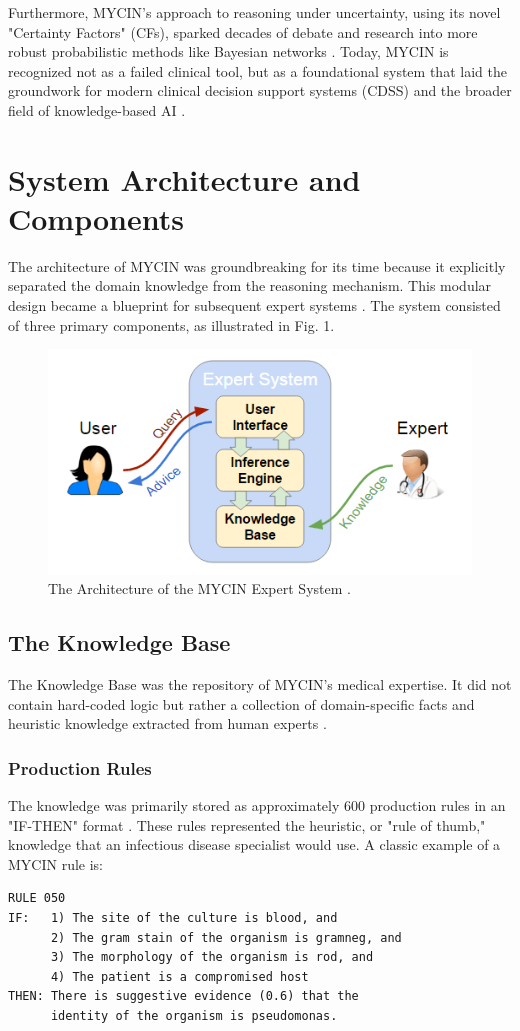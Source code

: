 \documentclass[conference]{IEEEtran}
\begin{document}
Furthermore, MYCIN's approach to reasoning under uncertainty, using its novel "Certainty Factors" (CFs), sparked decades of debate and research into more robust probabilistic methods like Bayesian networks \cite{b19, b20}. Today, MYCIN is recognized not as a failed clinical tool, but as a foundational system that laid the groundwork for modern clinical decision support systems (CDSS) and the broader field of knowledge-based AI \cite{b21}.

\section{System Architecture and Components}
The architecture of MYCIN was groundbreaking for its time because it explicitly separated the domain knowledge from the reasoning mechanism. This modular design became a blueprint for subsequent expert systems \cite{b4}. The system consisted of three primary components, as illustrated in Fig. 1.

\begin{figure}[htbp]
\centerline{\includegraphics[width=\columnwidth]{image/ES2.png}}
\caption{The Architecture of the MYCIN Expert System \cite{b6}.}
\label{fig}
\end{figure}

\subsection{The Knowledge Base}
The Knowledge Base was the repository of MYCIN's medical expertise. It did not contain hard-coded logic but rather a collection of domain-specific facts and heuristic knowledge extracted from human experts \cite{b22}.

\subsubsection{Production Rules}
The knowledge was primarily stored as approximately 600 production rules in an "IF-THEN" format \cite{b8}. These rules represented the heuristic, or "rule of thumb," knowledge that an infectious disease specialist would use. A classic example of a MYCIN rule is:
\begin{verbatim}
RULE 050
IF:   1) The site of the culture is blood, and
      2) The gram stain of the organism is gramneg, and
      3) The morphology of the organism is rod, and
      4) The patient is a compromised host
THEN: There is suggestive evidence (0.6) that the
      identity of the organism is pseudomonas.
\end{verbatim}
\end{document}

